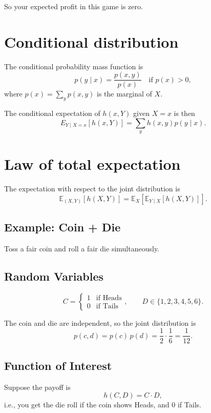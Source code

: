 So your expected profit in this game is zero.


\section{Conditional distribution}

The conditional probability mass function is
$$ p(y \mid x) = \frac{p(x,y)}{p(x)} \quad \text{if } p(x) > 0, $$
where $p(x) = \sum_{y} p(x,y)$ is the marginal of $X$.

The conditional expectation of $h(x,Y)$ given $X=x$ is then
$$ E_{Y \mid X=x}[h(x,Y)] = \sum_{y} h(x,y) p(y \mid x). $$


\section{Law of total expectation}

The expectation with respect to the joint distribution is
\begin{equation}
  \mathbb{E}_{(X,Y)}[h(X,Y)]=\mathbb{E}_{X}[\mathbb{E}_{Y\mid X}[h(X,Y)]].
\end{equation}


\subsection*{Example: Coin + Die}

Toss a fair coin and roll a fair die simultaneously.

\subsection*{Random Variables}
\[
C = 
\begin{cases}
1 & \text{if Heads} \\
0 & \text{if Tails}
\end{cases}, 
\qquad
D \in \{1,2,3,4,5,6\}.
\]

The coin and die are independent, so the joint distribution is
\[
p(c,d) = p(c)\,p(d) = \frac{1}{2} \cdot \frac{1}{6} = \frac{1}{12}.
\]

\subsection*{Function of Interest}
Suppose the payoff is
\[
h(C,D) = C \cdot D,
\]
i.e., you get the die roll if the coin shows Heads, and 0 if Tails.

